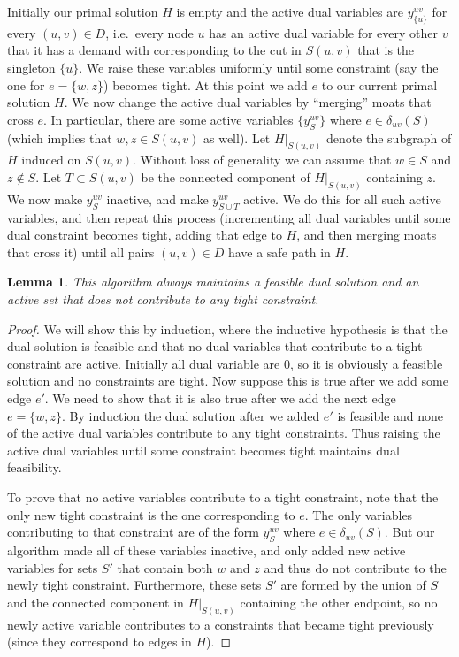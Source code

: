 \documentclass[11pt,letterpaper]{article}
\newtheorem{lemma}[theorem]{Lemma}
\theoremstyle{definition}
\newcounter{note}[section]
\begin{document}
Initially our primal solution $H$ is empty and the active dual
variables are $y_{\{u\}}^{uv}$ for every $(u,v) \in D$, i.e.\ every
node $u$ has an active dual variable for every other $v$ that it has a
demand with corresponding to the cut in $S(u,v)$ that is the singleton
$\{u\}$.  We raise these variables uniformly until some constraint
(say the one for $e = \{w,z\}$) becomes tight.  At this point we add
$e$ to our current primal solution $H$.  We now change the active dual
variables by ``merging'' moats that cross $e$.  In particular, there are some active variables $\{y_S^{uv}\}$ where $e \in \delta_{uv}(S)$ (which implies
that $w,z \in S(u,v)$ as well).  Let $H|_{S(u,v)}$
denote the subgraph of $H$ induced on
$S(u,v)$.  Without loss of generality we can assume that $w \in S$ and
$z \not\in S$.  Let $T \subset S(u,v)$ be the connected component of
$H|_{S(u,v)}$ containing $z$.  We now make $y_S^{uv}$ inactive, and
make $y_{S \cup T}^{uv}$ active.  We do this for all such active
variables, and then repeat this process (incrementing all dual
variables until some dual constraint becomes tight, adding that edge
to $H$, and then merging moats that cross it) until all pairs $(u,v)
\in D$ have a safe path in $H$.

\begin{lemma} \label{lem:PD_feasible} This algorithm always maintains
  a feasible dual solution and an active set that does not contribute
  to any tight constraint.
\end{lemma}
\begin{proof}
  We will show this by induction, where the inductive hypothesis is
  that the dual solution is feasible and that no dual variables that
  contribute to a tight constraint are active.  Initially all dual
  variable are $0$, so it is obviously a feasible solution and no
  constraints are tight.  Now suppose this is true after we add some
  edge $e'$.  We need to show that it is also true after we add the
  next edge $e = \{w,z\}$.  By induction the dual solution after we
  added $e'$ is feasible and none of the active dual variables
  contribute to any tight constraints.  Thus raising the active dual
  variables until some constraint becomes tight maintains dual
  feasibility.

  To prove that no active variables contribute to a tight constraint,
  note that the only new tight constraint is the one corresponding to
  $e$.  The only variables contributing to that constraint are of the
  form $y_S^{uv}$ where $e \in \delta_{uv}(S)$.  But our algorithm
  made all of these variables inactive, and only added new active
  variables for sets $S'$ that contain both $w$ and $z$ and thus do
  not contribute to the newly tight constraint.  Furthermore, these
  sets $S'$ are formed by the union of $S$ and the connected component
  in $H|_{S(u,v)}$ containing the other endpoint, so no newly active
  variable contributes to a constraints that became tight previously
  (since they correspond to edges in $H$).
\end{proof}
\end{document}
